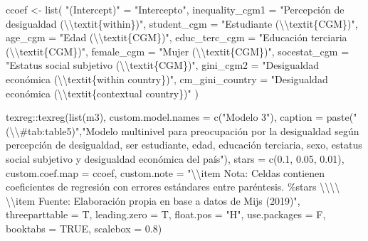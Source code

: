 \documentclass[
  12pt,
  a4paper,
]{article}
\newenvironment{Shaded}{\begin{snugshade}}{\end{snugshade}}
\newcommand{\AttributeTok}[1]{\textcolor[rgb]{0.77,0.63,0.00}{#1}}
\newcommand{\ConstantTok}[1]{\textcolor[rgb]{0.00,0.00,0.00}{#1}}
\newcommand{\FloatTok}[1]{\textcolor[rgb]{0.00,0.00,0.81}{#1}}
\newcommand{\FunctionTok}[1]{\textcolor[rgb]{0.00,0.00,0.00}{#1}}
\newcommand{\NormalTok}[1]{#1}
\newcommand{\OtherTok}[1]{\textcolor[rgb]{0.56,0.35,0.01}{#1}}
\newcommand{\SpecialCharTok}[1]{\textcolor[rgb]{0.00,0.00,0.00}{#1}}
\newcommand{\StringTok}[1]{\textcolor[rgb]{0.31,0.60,0.02}{#1}}
\begin{document}
\begin{Shaded}
\begin{Highlighting}[]
\NormalTok{ccoef }\OtherTok{\textless{}{-}} \FunctionTok{list}\NormalTok{(}
  \StringTok{"(Intercept)"} \OtherTok{=} \StringTok{"Intercepto"}\NormalTok{,}
  \AttributeTok{inequality\_cgm1 =} \StringTok{"Percepción de desigualdad (}\SpecialCharTok{\textbackslash{}\textbackslash{}}\StringTok{textit\{within\})"}\NormalTok{,}
  \AttributeTok{student\_cgm =} \StringTok{"Estudiante (}\SpecialCharTok{\textbackslash{}\textbackslash{}}\StringTok{textit\{CGM\})"}\NormalTok{,}
  \AttributeTok{age\_cgm =} \StringTok{"Edad (}\SpecialCharTok{\textbackslash{}\textbackslash{}}\StringTok{textit\{CGM\})"}\NormalTok{,}
  \AttributeTok{educ\_terc\_cgm =} \StringTok{"Educación terciaria (}\SpecialCharTok{\textbackslash{}\textbackslash{}}\StringTok{textit\{CGM\})"}\NormalTok{,}
  \AttributeTok{female\_cgm =} \StringTok{"Mujer (}\SpecialCharTok{\textbackslash{}\textbackslash{}}\StringTok{textit\{CGM\})"}\NormalTok{,}
  \AttributeTok{socestat\_cgm =} \StringTok{"Estatus social subjetivo (}\SpecialCharTok{\textbackslash{}\textbackslash{}}\StringTok{textit\{CGM\})"}\NormalTok{,}
  \AttributeTok{gini\_cgm2 =} \StringTok{"Desigualdad económica (}\SpecialCharTok{\textbackslash{}\textbackslash{}}\StringTok{textit\{within country\})"}\NormalTok{,}
  \AttributeTok{cm\_gini\_country =} \StringTok{"Desigualdad económica (}\SpecialCharTok{\textbackslash{}\textbackslash{}}\StringTok{textit\{contextual country\})"}
\NormalTok{ )}

\NormalTok{texreg}\SpecialCharTok{::}\FunctionTok{texreg}\NormalTok{(}\FunctionTok{list}\NormalTok{(m3),}
               \AttributeTok{custom.model.names =} \FunctionTok{c}\NormalTok{(}\StringTok{"Modelo 3"}\NormalTok{),}
               \AttributeTok{caption =} \FunctionTok{paste}\NormalTok{(}\StringTok{"(}\SpecialCharTok{\textbackslash{}\textbackslash{}}\StringTok{\#tab:table5)"}\NormalTok{,}\StringTok{"Modelo multinivel para preocupación por la desigualdad según percepción de desigualdad, ser estudiante, edad, educación terciaria, sexo, estatus social subjetivo y desigualdad económica del país"}\NormalTok{),}
               \AttributeTok{stars =} \FunctionTok{c}\NormalTok{(}\FloatTok{0.1}\NormalTok{, }\FloatTok{0.05}\NormalTok{, }\FloatTok{0.01}\NormalTok{),}
               \AttributeTok{custom.coef.map =}\NormalTok{ ccoef,}
               \AttributeTok{custom.note =} \StringTok{"}\SpecialCharTok{\textbackslash{}\textbackslash{}}\StringTok{item Nota: Celdas contienen coeficientes de regresión con errores estándares entre paréntesis. \%stars }\SpecialCharTok{\textbackslash{}\textbackslash{}\textbackslash{}\textbackslash{}}\StringTok{ }\SpecialCharTok{\textbackslash{}\textbackslash{}}\StringTok{item Fuente: Elaboración propia en base a datos de Mijs (2019)"}\NormalTok{,}
               \AttributeTok{threeparttable =}\NormalTok{ T,}
               \AttributeTok{leading.zero =}\NormalTok{ T,}
               \AttributeTok{float.pos =} \StringTok{"H"}\NormalTok{,}
               \AttributeTok{use.packages =}\NormalTok{ F,}
               \AttributeTok{booktabs =} \ConstantTok{TRUE}\NormalTok{,}
               \AttributeTok{scalebox =} \FloatTok{0.8}\NormalTok{)}



\end{Highlighting}
\end{Shaded}
\end{document}

